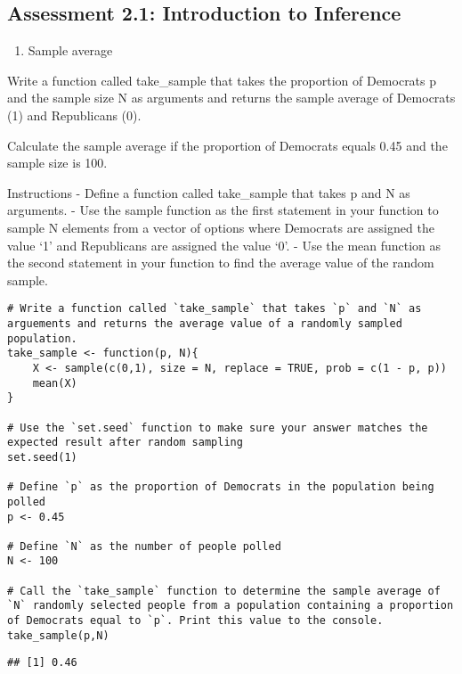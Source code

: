 \documentclass[
]{article}
\providecommand{\tightlist}{%
  \setlength{\itemsep}{0pt}\setlength{\parskip}{0pt}}
\begin{document}
\hypertarget{assessment-2.1-introduction-to-inference}{%
\subsection{Assessment 2.1: Introduction to
Inference}\label{assessment-2.1-introduction-to-inference}}

\begin{enumerate}
\def\labelenumi{\arabic{enumi}.}
\tightlist
\item
  Sample average
\end{enumerate}

Write a function called take\_sample that takes the proportion of
Democrats p and the sample size N as arguments and returns the sample
average of Democrats (1) and Republicans (0).

Calculate the sample average if the proportion of Democrats equals 0.45
and the sample size is 100.

Instructions - Define a function called take\_sample that takes p and N
as arguments. - Use the sample function as the first statement in your
function to sample N elements from a vector of options where Democrats
are assigned the value `1' and Republicans are assigned the value `0'. -
Use the mean function as the second statement in your function to find
the average value of the random sample.

\begin{verbatim}
# Write a function called `take_sample` that takes `p` and `N` as arguements and returns the average value of a randomly sampled population.
take_sample <- function(p, N){
    X <- sample(c(0,1), size = N, replace = TRUE, prob = c(1 - p, p))
    mean(X)
}

# Use the `set.seed` function to make sure your answer matches the expected result after random sampling
set.seed(1)

# Define `p` as the proportion of Democrats in the population being polled
p <- 0.45

# Define `N` as the number of people polled
N <- 100

# Call the `take_sample` function to determine the sample average of `N` randomly selected people from a population containing a proportion of Democrats equal to `p`. Print this value to the console.
take_sample(p,N)
\end{verbatim}

\begin{verbatim}
## [1] 0.46
\end{verbatim}
\end{document}
